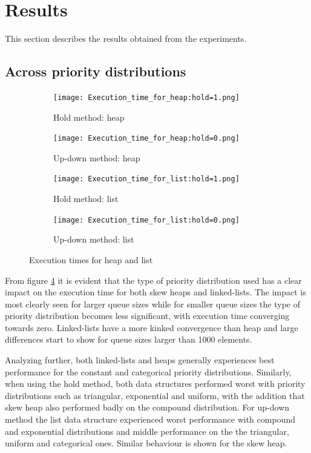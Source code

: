 \documentclass{article}
\begin{document}
\section{Results}
This section describes the results obtained from the experiments.

\subsection{Across priority distributions}
\begin{figure}[H]
\centering
    \begin{subfigure}[H]{0.4\linewidth}
    \texttt{[image: Execution\_time\_for\_heap:hold=1.png]}
    \caption{Hold method: heap}
    \label{exec_heap_hold}
    \end{subfigure}
    \begin{subfigure}[H]{0.4\linewidth}
    \texttt{[image: Execution\_time\_for\_heap:hold=0.png]}
    \caption{Up-down method: heap}
    \label{heap_up_down_first}
    \end{subfigure}
    \begin{subfigure}[H]{0.4\linewidth}
    \texttt{[image: Execution\_time\_for\_list:hold=1.png]}
    \caption{Hold method: list}
    \end{subfigure}
    \begin{subfigure}[H]{0.4\linewidth}
    \texttt{[image: Execution\_time\_for\_list:hold=0.png]}
    \caption{Up-down method: list}
    \label{}
    \end{subfigure}
\caption{Execution times for heap and list}
\label{fig:heap_list_exec}
\end{figure}

From figure \ref{fig:heap_list_exec} it is evident that the type of priority distribution used has a clear impact on the execution time for both skew heaps and linked-lists. The impact is most clearly seen for larger queue sizes while for smaller queue sizes the type of priority distribution becomes less significant, with execution time converging towards zero. Linked-lists have a more kinked convergence than heap and large differences start to show for queue sizes larger than 1000 elements.

Analyzing further, both linked-lists and heaps generally experiences best performance for the constant and categorical priority distributions. Similarly, when using the hold method, both data structures performed worst with priority distributions such as triangular, exponential and uniform, with the addition that skew heap also performed badly on the compound distribution. For up-down method the list data structure experienced worst performance with compound and exponential distributions and middle performance on the the triangular, uniform and categorical ones. Similar behaviour is shown for the skew heap.
\end{document}
